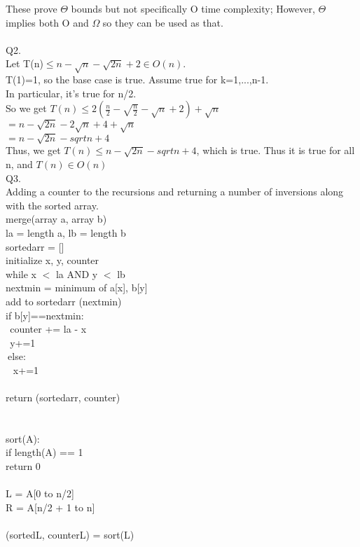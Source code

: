 \documentclass[10pt,a4paper]{article}
\begin{document}
These prove $\Theta$ bounds but not specifically O time complexity; However, $\Theta$ implies both O and $\Omega$ so they can be used as that. \\
\\
Q2.\\
Let T(n)$\leq n- \sqrt{n}-\sqrt{2n}+2 \in O (n)$. \\
T(1)=1, so the base case is true. Assume true for k=1,...,n-1.\\
In particular, it's true for n/2. \\
So we get $T(n)\leq 2(\frac{n}{2}-\sqrt{\frac{n}{2}}-\sqrt{n}+2)+\sqrt{n}$\\
$=n-\sqrt{2n}-2\sqrt{n}+4+\sqrt{n}$\\
$=n-\sqrt{2n}-sqrt{n}+4$\\
Thus, we get $T(n)\leq n-\sqrt{2n}-sqrt{n}+4$, which is true.
Thus it is true for all n, and $T(n)\in O (n)$ \\
Q3.\\
Adding a counter to the recursions and returning a number of inversions along with the sorted array. \\
 merge(array a, array b) { \\
la = length a, lb = length b \\
sortedarr = [] \\
initialize x, y, counter \\
while x $<$ la AND y $<$ lb { \\
	\quad nextmin = minimum of a[x], b[y] \\
	\quad add to sortedarr (nextmin) \\
	\quad if b[y]==nextmin: \\
		$\> \>$counter += la - x \\
		$\> \>$y+=1 \\
	$\>$else: \\
	$\> \>$	x+=1 \\
}\\
return (sortedarr, counter) \\
} \\
\\
sort(A): \\
if length(A) == 1 \\
	return 0 \\
	\\
L = A[0 to n/2] \\
R = A[n/2 + 1 to n] \\
\\
(sortedL, counterL) = sort(L) \\
\end{document}
